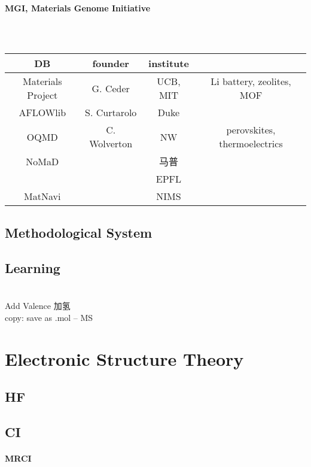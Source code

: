 \documentclass[a4paper]{article}
\numberwithin{equation}{section}
\begin{document}
\paragraph{MGI, Materials Genome Initiative}~\\
\begin{table}[H]
	\centering
	\begin{tabular}{cccc}
		\hline
		DB & founder  & institute  & \\ \hline
		Materials Project & G. Ceder & UCB, MIT & Li battery, zeolites, MOF\\
		AFLOWlib & S. Curtarolo & Duke & \\
		OQMD & C. Wolverton & NW & perovskites, thermoelectrics\\
		NoMaD & & 马普 & \\
		&& EPFL &\\
		MatNavi & & NIMS &\\
		\hline
	\end{tabular}
	\caption{}
\end{table}

\subsection{Methodological System}

\subsection{Learning}

\section{}
Add Valence 加氢\\
copy: save as .mol -- MS

\section{Electronic Structure Theory}
\subsection{HF}
\subsection{CI}
\paragraph{MRCI}
\end{document}
